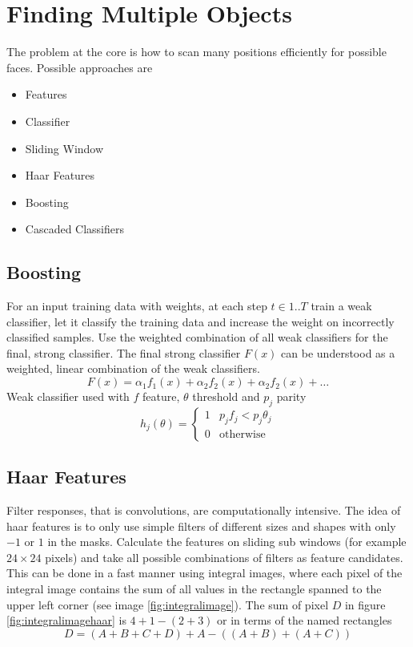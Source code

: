 
\section{Finding Multiple Objects}
The problem at the core is how to scan many positions efficiently for possible faces. Possible approaches are
\begin{itemize}[label=-, nosep]
	\item {\color{DodgerBlue4} Features}
	\item {\color{DodgerBlue4} Classifier}
	\item {\color{DodgerBlue4} Sliding Window}
	\item {\color{Firebrick1} Haar Features}
	\item {\color{Firebrick1} Boosting}
	\item {\color{Firebrick1} Cascaded Classifiers}
\end{itemize}

\subsection{Boosting}
For an input training data with weights, at each step $t \in 1..T$ train a weak classifier,
let it classify the training data and increase the weight on incorrectly classified samples.
Use the weighted combination of all weak classifiers for the final, strong classifier.
The final strong classifier $F(x)$ can be understood as a weighted, linear combination of the weak classifiers.
\begin{equation*}
	F(x) = \alpha_1 f_1(x) + \alpha_2 f_2(x) + \alpha_2 f_2(x) + \dots
\end{equation*}
Weak classifier used with $f$ feature, $\theta$ threshold and $p_j$ parity
\begin{equation*}
	h_j (\theta) = \left\{ \begin{matrix}
		1 & p_j f_j < p_j \theta_j\\
		0 & \text{otherwise}
		\end{matrix} \right.
\end{equation*}

\subsection{Haar Features}
Filter responses, that is convolutions, are computationally intensive. The idea of haar features is to only use
simple filters of different sizes and shapes with only $-1$ or $1$ in the masks.
Calculate the features on sliding sub windows (for example $24\times24$ pixels) and take all possible combinations of
filters as feature candidates. This can be done in a fast manner using integral images,
where each pixel of the integral image contains the sum of all values in the
rectangle spanned to the upper left corner (see image \ref{fig:integralimage}).
The sum of pixel $D$ in figure \ref{fig:integralimagehaar} is $4 + 1 - (2 + 3)$ or in terms of the named rectangles
\begin{equation*}
	D = (A+B+C+D) + A - ((A+B) + (A+C))
\end{equation*}

